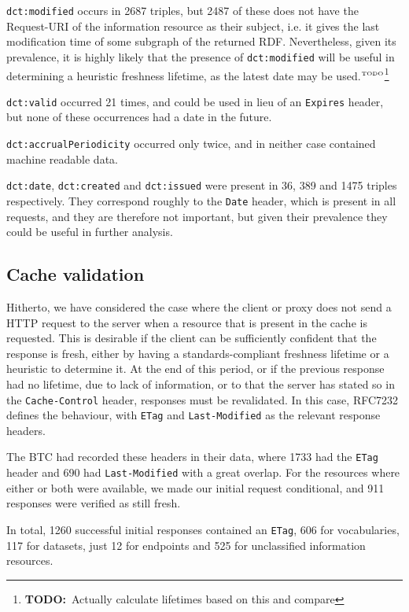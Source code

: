 \documentclass{llncs}
\newcommand{\rdfterm}[1]{\texttt{#1}}
\newcommand{\httph}[1]{\texttt{#1}}
\newcommand{\todo}[1]{\ensuremath{^{\textrm{\tiny{TODO}\normalsize}}}\footnote{\textbf{TODO:}~#1}}
\begin{document}
\rdfterm{dct:modified} occurs in 2687 triples, but 2487 of these does
not have the Request-URI of the information resource as their subject,
i.e. it gives the last modification time of some subgraph of the
returned RDF. Nevertheless, given its prevalence, it is highly likely
that the presence of \rdfterm{dct:modified} will be useful in
determining a heuristic freshness lifetime, as the latest date may be
used.\todo{Actually calculate lifetimes based on this and compare}

\rdfterm{dct:valid} occurred 21 times, and could be used in lieu of an
\httph{Expires} header, but none of these occurrences had a date in the
future.

\rdfterm{dct:accrualPeriodicity} occurred only twice, and in neither
case contained machine readable data.

\rdfterm{dct:date}, \rdfterm{dct:created} and \rdfterm{dct:issued}
were present in 36, 389 and 1475 triples respectively. They correspond
roughly to the \httph{Date} header, which is present in all requests,
and they are therefore not important, but given their prevalence they
could be useful in further analysis.

\subsection{Cache validation}

Hitherto, we have considered the case where the client or proxy does
not send a HTTP request to the server when a resource that is present
in the cache is requested. This is desirable if the client can be
sufficiently confident that the response is fresh, either by having a
standards-compliant freshness lifetime or a heuristic to determine
it. At the end of this period, or if the previous response had no
lifetime, due to lack of information, or to that the server has stated
so in the \httph{Cache-Control} header, responses must be
revalidated. In this case, RFC7232 defines the behaviour, with
\httph{ETag} and \httph{Last-Modified} as the relevant response
headers.

The BTC had recorded these headers in their data, where 1733 had the
\httph{ETag} header and 690 had \httph{Last-Modified} with a great
overlap. For the resources where either or both were available, we
made our initial request conditional, and 911 responses were verified
as still fresh. 

In total, 1260 successful initial responses contained
an \httph{ETag}, 606 for vocabularies, 117 for datasets, just 12 for
endpoints and 525 for unclassified information resources.
\end{document}
